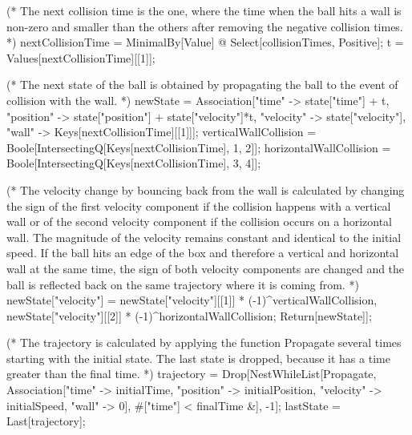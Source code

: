 \documentclass{tstextbook}
\begin{document}
\begin{example}
\begin{mathematica}
      (* The next collision time is the one, where the time when the ball hits
         a wall is non-zero and smaller than the others after removing the negative
         collision times. *) 
      nextCollisionTime = MinimalBy[Value] @ Select[collisionTimes, Positive];
      t = Values[nextCollisionTime][[1]];

      (* The next state of the ball is obtained by propagating the ball to the
         event of collision with the wall. *)
      newState = Association["time" -> state["time"] + t,
                             "position" -> state["position"] + state["velocity"]*t,
                             "velocity" -> state["velocity"],
                             "wall" -> Keys[nextCollisionTime][[1]]];
      verticalWallCollision = Boole[IntersectingQ[Keys[nextCollisionTime],
                                                  {1, 2}]];
      horizontalWallCollision = Boole[IntersectingQ[Keys[nextCollisionTime],
                                                    {3, 4}]];

      (* The velocity change by bouncing back from the wall is calculated
         by changing the sign of the first velocity component if the collision
         happens with a vertical wall or of the second velocity component if the
         collision occurs on a horizontal wall. The magnitude of the velocity
         remains constant and identical to the initial speed. If the ball hits
         an edge of the box and therefore a vertical and horizontal wall at the
         same time, the sign of both velocity components are changed and the ball
         is reflected back on the same trajectory where it is coming from. *)
      newState["velocity"] = {newState["velocity"][[1]] *
                                       (-1)^verticalWallCollision,
                              newState["velocity"][[2]] *
                                       (-1)^horizontalWallCollision};
      Return[newState]];

   (* The trajectory is calculated by applying the function Propagate
      several times starting with the initial state. The last state
      is dropped, because it has a time greater than the final time. *)
   trajectory = Drop[NestWhileList[Propagate, 
                              Association["time" -> initialTime,
                                          "position" -> initialPosition, 
                                          "velocity" -> initialSpeed,
                                          "wall" -> 0],
                              #["time"] < finalTime &], -1];
   lastState = Last[trajectory];


\end{mathematica}
\end{example}
\end{document}
